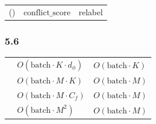 \documentclass[
  12pt,
]{article}
\begin{document}
\begin{longtable}[]{@{}
  >{\raggedright\arraybackslash}p{}
  >{\raggedright\arraybackslash}p{}
  >{\raggedright\arraybackslash}p{}@{}}
\toprule\noalign{}
\begin{minipage}[b]{\linewidth}\raggedright

\end{minipage} & \begin{minipage}[b]{\linewidth}\raggedright

\end{minipage} & \begin{minipage}[b]{\linewidth}\raggedright

\end{minipage} \\
\midrule\noalign{}
\endhead
\bottomrule\noalign{}
\endlastfoot
 7 () & \(\text{conflict\_score}\) & relabel
 \\
\end{longtable}

\subsubsection{5.6 }\label{ux8ba1ux7b97ux590dux6742ux5ea6-4}

\begin{longtable}[]{@{}
  >{\raggedright\arraybackslash}p{}
  >{\raggedright\arraybackslash}p{}
  >{\raggedright\arraybackslash}p{}@{}}
\toprule\noalign{}
\begin{minipage}[b]{\linewidth}\raggedright

\end{minipage} & \begin{minipage}[b]{\linewidth}\raggedright

\end{minipage} & \begin{minipage}[b]{\linewidth}\raggedright

\end{minipage} \\
\midrule\noalign{}
\endhead
\bottomrule\noalign{}
\endlastfoot
 & \(O(\text{batch} \cdot K \cdot d_\phi)\) &
\(O(\text{batch} \cdot K)\) \\
 & \(O(\text{batch} \cdot M \cdot K)\) &
\(O(\text{batch} \cdot M)\) \\
 & \(O(\text{batch} \cdot M \cdot C_f)\) &
\(O(\text{batch} \cdot M)\) \\
 & \(O(\text{batch} \cdot M^2)\) &
\(O(\text{batch} \cdot M)\) \\
\end{longtable}
\end{document}
